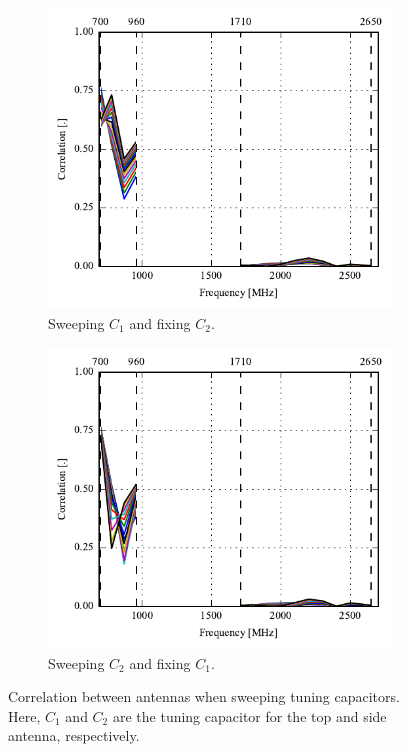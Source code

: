 \begin{figure}[htbp]
    \centering
    \begin{subfigure}{0.49\linewidth}
        \includegraphics{img/tech_sol/monopole/free_space/s11_corr}
        \caption{Sweeping $C_1$ and fixing $C_2$.}
    \end{subfigure}
    \hfill
    \begin{subfigure}{0.49\linewidth}
        \includegraphics{img/tech_sol/monopole/free_space/s22_corr}
        \caption{Sweeping $C_2$ and fixing $C_1$.}
    \end{subfigure}
    \caption{Correlation between antennas when sweeping tuning capacitors. Here, $C_1$ and $C_2$ are the tuning capacitor for the top and side antenna, respectively.}
    \label{fig:corr_sol1}
\end{figure}




